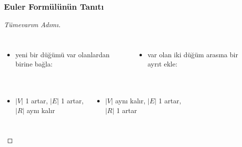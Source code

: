 \documentclass[dvipsnames]{beamer}
\theoremstyle{definition}
\theoremstyle{example}
\theoremstyle{plain}
\begin{document}
\begin{frame}
  \frametitle{Euler Formülünün Tanıtı}

  \begin{proof}[Tümevarım Adımı]
    \begin{columns}[t]
      \begin{itemize}
        \item yeni bir düğümü var olanlardan birine bağla:

        \medskip
      \end{itemize}

      \begin{itemize}
        \item var olan iki düğüm arasına bir ayrıt ekle:

        \medskip
      \end{itemize}
    \end{columns}

    \pause
    \begin{columns}
      \begin{itemize}
        \item $|V|$ 1 artar, $|E|$ 1 artar,\\
          $|R|$ aynı kalır
      \end{itemize}

      \pause
      \begin{itemize}
        \item $|V|$ aynı kalır, $|E|$ 1 artar,\\
          $|R|$ 1 artar
      \end{itemize}
    \end{columns}
  \end{proof}
\end{frame}
\end{document}
